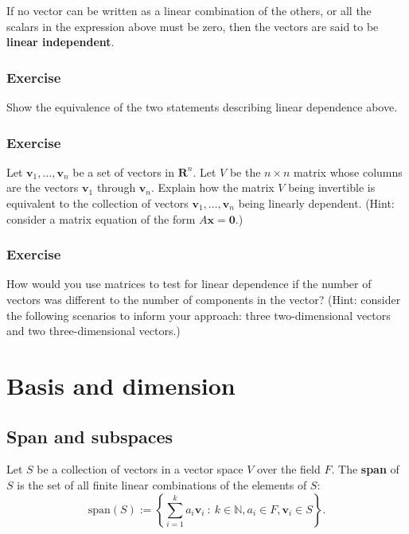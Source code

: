 \documentclass[a4paper,12pt]{amsart}
\begin{document}
    If no vector can be written as a linear combination of the others, or all the scalars in the expression above must be zero, then the vectors are said to be \textbf{linear independent}.

    \subsubsection{Exercise} Show the equivalence of the two statements describing linear dependence above.

    \subsubsection{Exercise} Let $\mathbf{v}_1, \ldots, \mathbf{v}_n$ be a set of vectors in $\mathbf{R}^n$. Let $V$ be the $n \times n$ matrix whose columns are the vectors $\mathbf{v}_1$ through $\mathbf{v}_n$. Explain how the matrix $V$ being invertible is equivalent to the collection of vectors $\mathbf{v}_1, \ldots, \mathbf{v}_n$ being linearly dependent. (Hint: consider a matrix equation of the form $A\mathbf{x} = \mathbf{0}$.)

    \subsubsection{Exercise} How would you use matrices to test for linear dependence if the number of vectors was different to the number of components in the vector? (Hint: consider the following scenarios to inform your approach: three two-dimensional vectors and two three-dimensional vectors.)

    \section{Basis and dimension}

    \subsection{Span and subspaces} Let $S$ be a collection of vectors in a vector space $V$ over the field $F$. The \textbf{span} of $S$ is the set of all finite linear combinations of the elements of $S$:
    \[ \mathrm{span} (S) := \left\{ \sum_{i=1}^k a_i \mathbf{v}_i \: : \: k \in \mathbb{N}, a_i \in F, \mathbf{v}_i \in S \right \}. \]
    
\end{document}
